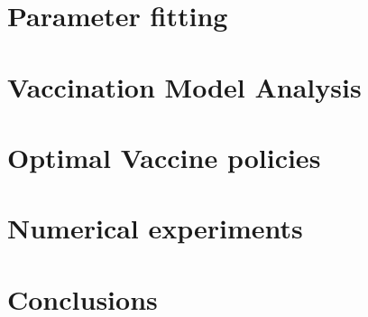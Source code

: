 \documentclass[preprint, sort&compress]{elsarticle}
\begin{document}
	\section{Parameter fitting}%
	    
	\section{Vaccination Model Analysis}
		
	\section{Optimal Vaccine policies}
		
	\section{Numerical experiments}
		
	\section{Conclusions}
		
    
\end{document}
